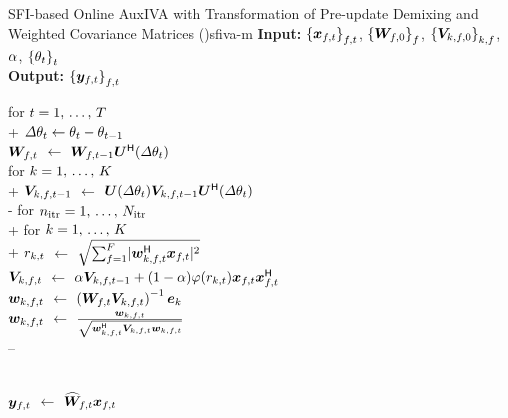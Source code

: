 \documentclass[sip,biber]{now-journal}
\begin{document}
\begin{algorithm}{SFI-based Online AuxIVA with Transformation of Pre-update Demixing and Weighted Covariance Matrices (\SFIIVAm)}{sfiva-m}
  \textbf{Input:} ${\{\Obs _{\ft}\}} _{\ft}$, ${\{\bm{W} _{f,0}\}} _{f}$, ${\{\bm{V} _{k,f,0}\}} _{k,f}$, $\alpha$, ${\{\theta _{t}\}} _{t}$ \\
  \textbf{Output:} ${\{\Est _{\ft}\}} _{\ft}$
  \begin{pseudo}

    for $t = 1,\, \dots,\, T$ \\+
      $\varDelta \theta _{t} \gets \theta _{t} - \theta _{t - 1}$ \\
      {$\bm{W} _{f,t}$} $\gets$ $\bm{W} _{f,t - 1} \bm{U} ^{\mathsf{H}} (\varDelta\theta _{t})$ \ct{$\forall \freq$} \\
      for $k = 1,\, \dots,\, K$ \\+
        {$\cov _{\src,\ft[-1]}$} $\gets$ $\rotMat (\varDelta\rotSpat _{\tframe}) \cov _{\src,\ft[-1]} \rotMat ^{\hermite} (\varDelta \rotSpat _{\tframe})$ \ct{$\forall \freq$} \\-
      for $n _{\mathrm{itr}} = 1,\, \dots,\, N _{\mathrm{itr}}$ \\+
        for $k = 1,\, \dots,\, K$ \\+
          {$r _{k,t}$} $\gets$ $\sqrt{\sum _{\freq = 1} ^{\Freq} \abs{\demix _{\src,\ft} ^{\hermite} \Obs _{\ft}} ^2}$ \ct{\eqref{eq:var}} \\
          {$\cov _{\src,\ft}    $} $\gets$ $\forget \cov _{\src,\ft[-1]} + (1 - \forget) \weight(\var _{\src,\tframe}) \Obs _{\ft} \Obs _{\ft} ^{\hermite}$ \ct{\eqref{eq:cov}, $\forall \freq$} \\
          {$\demix _{\src,\ft}$} $\gets$ $\left(\Demix _{\ft} \cov _{\src,\ft}\right) ^{-1} \eye _{\src}$ \ct{\eqref{eq:ip:proj}, $\forall \freq$} \\
          {$\demix _{\src,\ft}$} $\gets$ $\frac{\demix _{\src,\ft}}{\sqrt{\demix _{\src,\ft} ^{\hermite} \cov _{\src,\ft} \demix _{\src,\ft}}}$ \ct{\eqref{eq:ip:norm}, $\forall \freq$} \\--

       \ct{\eqref{eq:pb:w}, $\forall \freq$}\\
      {$\Est _{\ft}$} $\gets$ $\proj{\Demix }_{\ft} \Obs _{\ft}$ \ct{\eqref{eq:pb:y}, $\forall \freq$}
  \end{pseudo}
\end{algorithm}
\end{document}
